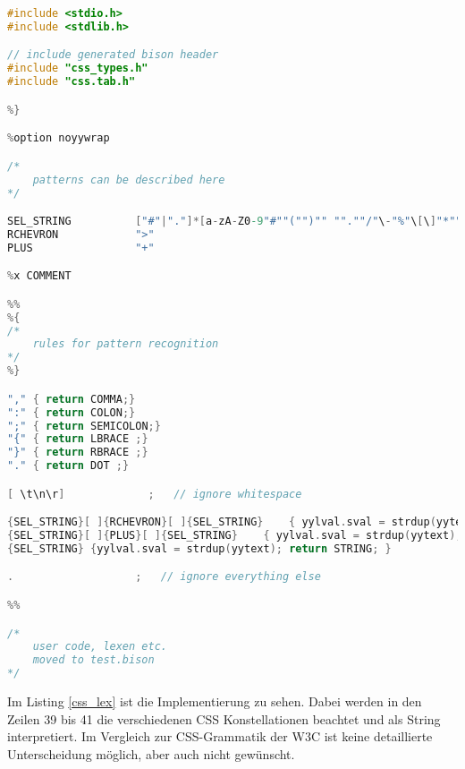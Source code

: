 \begin{lstlisting}[label=css_lex,language=C, caption=Beschreibung der CSS Grammatik in Flex]
%{
#include <stdio.h>
#include <stdlib.h>

// include generated bison header
#include "css_types.h"
#include "css.tab.h"

%}

%option noyywrap

/* 
    patterns can be described here
*/

SEL_STRING			["#"|"."]*[a-zA-Z0-9"#""("")"" "".""/"\-"%"\[\]"*""_""=""!""@""'""?"]+
RCHEVRON			">"
PLUS				"+"

%x COMMENT

%%
%{
/*
    rules for pattern recognition
*/
%}

"," { return COMMA;}
":" { return COLON;}
";" { return SEMICOLON;}
"{" { return LBRACE ;}
"}" { return RBRACE ;}
"." { return DOT ;}

[ \t\n\r]             ;   // ignore whitespace

{SEL_STRING}[ ]{RCHEVRON}[ ]{SEL_STRING}	{ yylval.sval = strdup(yytext); return STRING; }
{SEL_STRING}[ ]{PLUS}[ ]{SEL_STRING}	{ yylval.sval = strdup(yytext); return STRING; }
{SEL_STRING} {yylval.sval = strdup(yytext); return STRING; }

.                   ;   // ignore everything else

%%

/*
    user code, lexen etc.
    moved to test.bison
*/
\end{lstlisting} 
Im Listing \ref{css_lex} ist die Implementierung zu sehen. Dabei werden in den Zeilen 39 bis 41 die verschiedenen CSS Konstellationen beachtet und als String interpretiert. Im Vergleich zur CSS-Grammatik der W3C ist keine detaillierte Unterscheidung möglich, aber auch nicht gewünscht.

